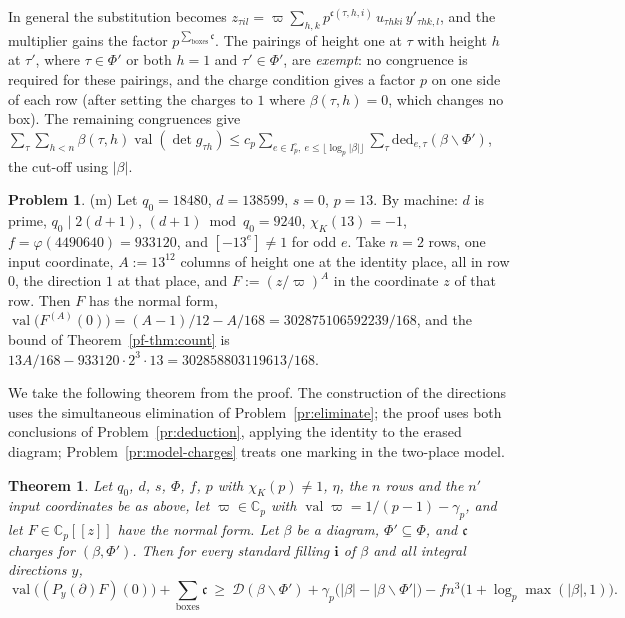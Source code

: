 \documentclass[reqno]{amsart}
\theoremstyle{plain}
\newtheorem{theorem}{Theorem}[section]
\theoremstyle{definition}
\newtheorem{problem}{Problem}[section]
\theoremstyle{remark}
\newcommand{\C}{\mathbb{C}}
\newcommand{\val}{\operatorname{val}}
\newcommand{\Dc}{\mathcal{D}}
\newcommand{\ch}{\mathfrak{c}}
\newcommand{\bi}{\mathbf{i}}
\begin{document}
In general the substitution becomes \(z_{\tau i l} = \varpi \sum_{h, k} p^{\ch(\tau, h, i)}\, u_{\tau h k i}\, y'_{\tau h k, l}\), and the multiplier gains the factor \(p^{\sum_{\text{boxes}} \ch}\).  The pairings of height one at \(\tau\) with height \(h\) at \(\tau'\), where \(\tau \in \Phi'\) or both \(h = 1\) and \(\tau' \in \Phi'\), are \emph{exempt}: no congruence is required for these pairings, and the charge condition gives a factor \(p\) on one side of each row (after setting the charges to \(1\) where \(\beta(\tau, h) = 0\), which changes no box).  The remaining congruences give \(\sum_{\tau}\sum_{h<n} \beta(\tau, h)\val(\det g_{\tau h}) \le c_p \sum_{e \in I_p^\circ,\ e \le \lfloor\log_p\lvert\beta\rvert\rfloor} \sum_\tau \mathrm{ded}_{e,\tau}(\beta \smallsetminus \Phi')\), the cut-off using \(\lvert\beta\rvert\).

\begin{problem}\label{pr:real-instance}
(m) Let \(q_0 = 18480\), \(d = 138599\), \(s = 0\), \(p = 13\).  By machine: \(d\) is prime, \(q_0 \mid 2(d+1)\), \((d + 1) \bmod q_0 = 9240\), \(\chi_K(13) = -1\), \(f = \varphi(4490640) = 933120\), and \([-13^e] \ne 1\) for odd \(e\).  Take \(n = 2\) rows, one input coordinate, \(A := 13^{12}\) columns of height one at the identity place, all in row \(0\), the direction \(1\) at that place, and \(F := (z/\varpi)^A\) in the coordinate \(z\) of that row.  Then \(F\) has the normal form, \(\val\bigl(F^{(A)}(0)\bigr) = (A - 1)/12 - A/168 = 302875106592239/168\), and the bound of Theorem~\ref{pf-thm:count} is \(13A/168 - 933120 \cdot 2^3 \cdot 13 = 302858803119613/168\).
\end{problem}

We take the following theorem from the proof.  The construction of the directions uses the simultaneous elimination of Problem~\ref{pr:eliminate}; the proof uses both conclusions of Problem~\ref{pr:deduction}, applying the identity to the erased diagram; Problem~\ref{pr:model-charges} treats one marking in the two-place model.

\begin{theorem}\label{thm:count-charges}
Let \(q_0\), \(d\), \(s\), \(\Phi\), \(f\), \(p\) with \(\chi_K(p) \ne 1\), \(\eta\), the \(n\) rows and the \(n'\) input coordinates be as above, let \(\varpi \in \C_p\) with \(\val \varpi = 1/(p-1) - \gamma_p\), and let \(F \in \C_p[[z]]\) have the normal form.  Let \(\beta\) be a diagram, \(\Phi' \subseteq \Phi\), and \(\ch\) charges for \((\beta, \Phi')\).  Then for every standard filling \(\bi\) of \(\beta\) and all integral directions \(y\),
\[
  \val\bigl((P_y(\partial) F)(0)\bigr) + \sum_{\text{boxes}} \ch \ \ge\ \Dc(\beta \smallsetminus \Phi') + \gamma_p\bigl(\lvert\beta\rvert - \lvert\beta \smallsetminus \Phi'\rvert\bigr) - f n^3 \bigl(1 + \log_p \max(\lvert\beta\rvert, 1)\bigr) .
\]
\end{theorem}
\end{document}
